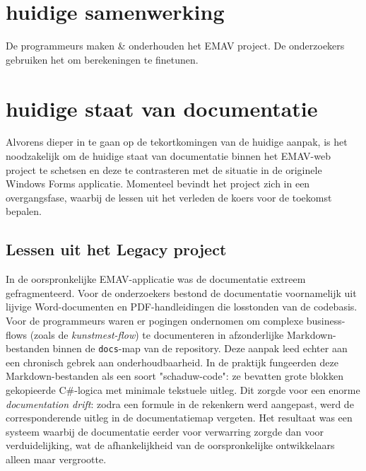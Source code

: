 \chapter{}
\chapter{huidige samenwerking}
De programmeurs maken \& onderhouden het EMAV project. De onderzoekers gebruiken het om berekeningen te finetunen.
\chapter{huidige staat van documentatie}
Alvorens dieper in te gaan op de tekortkomingen van de huidige aanpak, is het noodzakelijk om de huidige staat van documentatie binnen het EMAV-web project te schetsen en deze te contrasteren met de situatie in de originele Windows Forms applicatie. Momenteel bevindt het project zich in een overgangsfase, waarbij de lessen uit het verleden de koers voor de toekomst bepalen.
\section{Lessen uit het Legacy project}
In de oorspronkelijke EMAV-applicatie was de documentatie extreem gefragmenteerd. Voor de onderzoekers bestond de documentatie voornamelijk uit lijvige Word-documenten en PDF-handleidingen die losstonden van de codebasis. Voor de programmeurs waren er pogingen ondernomen om complexe business-flows (zoals de \textit{kunstmest-flow}) te documenteren in afzonderlijke Markdown-bestanden binnen de \texttt{docs}-map van de repository.
Deze aanpak leed echter aan een chronisch gebrek aan onderhoudbaarheid. In de praktijk fungeerden deze Markdown-bestanden als een soort "schaduw-code": ze bevatten grote blokken gekopieerde C\#-logica met minimale tekstuele uitleg. Dit zorgde voor een enorme \textit{documentation drift}: zodra een formule in de rekenkern werd aangepast, werd de corresponderende uitleg in de documentatiemap vergeten. Het resultaat was een systeem waarbij de documentatie eerder voor verwarring zorgde dan voor verduidelijking, wat de afhankelijkheid van de oorspronkelijke ontwikkelaars alleen maar vergrootte.
